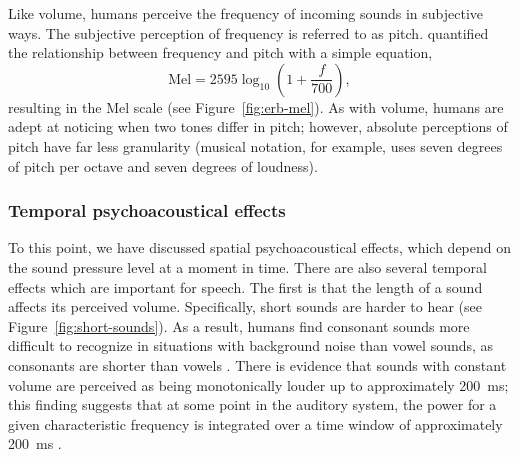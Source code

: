 
Like volume,
humans perceive
the frequency of incoming sounds
in subjective ways.
The subjective perception of frequency
is referred to as pitch.
\citet{stevens1937} quantified
the relationship between
frequency and pitch
with a simple equation,
\begin{equation*}
  \text{Mel} = 2595 \log_{10} \left(1 + \frac{f}{700}\right),
\end{equation*}
resulting in the Mel scale
(see Figure~\ref{fig:erb-mel}).
As with volume, humans are adept at
noticing when two tones differ in pitch;
however, absolute perceptions of pitch
have far less granularity
(musical notation, for example,
uses seven degrees of pitch per octave
and seven degrees of loudness).

\subsubsection{Temporal psychoacoustical effects}

To this point, we have discussed
spatial psychoacoustical effects,
which depend on
the sound pressure level
at a moment in time.
There are also several temporal effects
which are important for speech.
The first is that the length
of a sound affects its perceived volume.
Specifically, short sounds are harder to hear
(see Figure~\ref{fig:short-sounds}).
As a result, humans find
consonant sounds more difficult
to recognize in situations with background noise
than vowel sounds,
as consonants are shorter than vowels
\citep[Chapter~3]{everest2001}.
There is evidence that sounds with constant volume
are perceived as being monotonically louder
up to approximately 200~ms;
this finding suggests that
at some point in the auditory system,
the power for a given characteristic frequency
is integrated over a time window
of approximately 200~ms
\citep[p.64]{kollmeier2008}.


